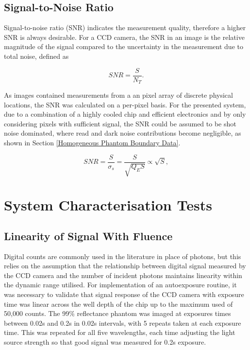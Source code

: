 \documentclass[twoside]{bhamthesis}
\theoremstyle{definition}
\begin{document}
\subsection{Signal-to-Noise Ratio} 
\label{SNR}
Signal-to-noise ratio (SNR) indicates the measurement quality, therefore a higher SNR is always desirable. For a CCD camera, the SNR in an image is the relative magnitude of the signal compared to the uncertainty in the measurement due to total noise, defined as 

\begin{equation}
{ SNR= \frac{S}{N_T}}.
  \label{eqn:SNR}
\end{equation}

As images contained measurements from a an pixel array of discrete physical locations, the SNR was calculated on a per-pixel basis. For the presented system, due to a combination of a highly cooled chip and efficient electronics and by only considering pixels with sufficient signal, the SNR could be assumed to be shot noise dominated, where read and dark noise contributions become negligible, as shown in Section \ref{Homogeneous Phantom Boundary Data}.

\begin{equation}
{ SNR= \frac{S}{\sigma_s}= \frac{S}{\sqrt{Q_ES}}} \propto \sqrt{S},
  \label{eqn:SNR}
\end{equation}

\section{System Characterisation Tests}

\subsection{Linearity of Signal With Fluence}
\label{Linearity of Signal with Exposure Time}

Digital counts are commonly used in the literature in place of photons, but this relies on the assumption that the relationship between digital signal measured by the CCD camera and the number of incident photons maintains linearity within the dynamic range utilised. For implementation of an autoexposure routine, it was necessary to validate that signal response of the CCD camera with exposure time was linear across the well depth of the chip up to the maximum used of 50,000 counts. The 99\% reflectance phantom was imaged at exposures times between 0.02s and 0.2s in 0.02s intervals, with 5 repeats taken at each exposure time. This was repeated for all five wavelengths, each time adjusting the light source strength so that good signal was measured for 0.2s exposure.
\end{document}
